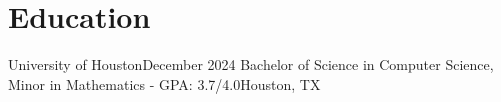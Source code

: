 \section{Education}
\resumeSubHeadingListStart
    \resumeSubheading
    {University of Houston}{December 2024}
    {Bachelor of Science in Computer Science, Minor in Mathematics - GPA: 3.7/4.0}{Houston, TX}
    \resumeItemListStart
    \resumeItemListEnd
\resumeSubHeadingListEnd
